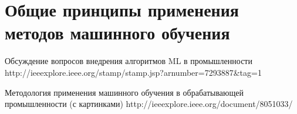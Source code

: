 \chapter{Общие принципы применения методов машинного обучения} \label{chapt4}


Обсуждение вопросов внедрения алгоритмов ML в промышленности
http://ieeexplore.ieee.org/stamp/stamp.jsp?arnumber=7293887\&tag=1

Методология применения машинного обучения в обрабатывающей промышленности (с картинками)
http://ieeexplore.ieee.org/document/8051033/
